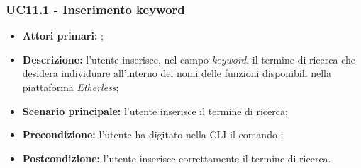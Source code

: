 \subsubsection{UC11.1 - Inserimento keyword}
\begin{itemize}
	\item \textbf{Attori primari:} \ua{};
	\item \textbf{Descrizione:} l’utente inserisce, nel campo \textit{keyword}, il termine di ricerca che desidera individuare all’interno dei nomi delle funzioni disponibili nella piattaforma \textit{Etherless}; 
	\item \textbf{Scenario principale:} l'utente inserisce il termine di ricerca;
	\item \textbf{Precondizione:} l’utente ha digitato nella CLI il comando \search{};
	\item \textbf{Postcondizione:} l’utente inserisce correttamente il termine di ricerca. 
\end{itemize}